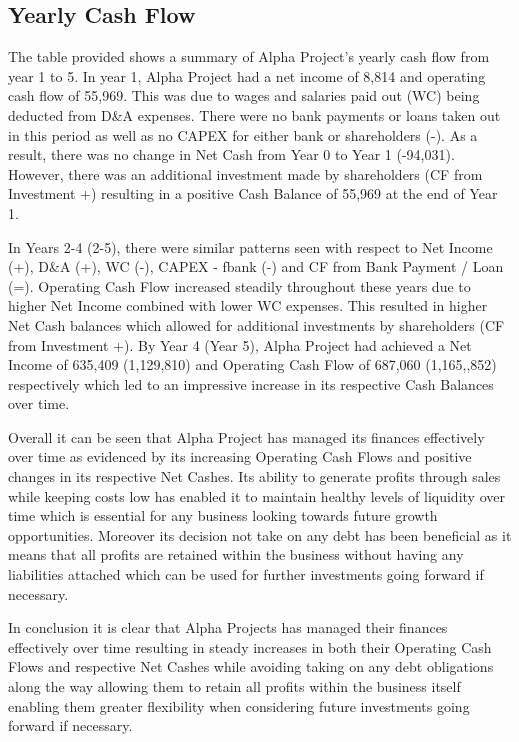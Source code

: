 

\subsection{Yearly Cash Flow}\label{sec:title}

The table provided shows a summary of Alpha Project's yearly cash flow from year 1 to 5. In year 1, Alpha Project had a net income of 8,814 and operating cash flow of 55,969. This was due to wages and salaries paid out (WC) being deducted from D&A expenses. There were no bank payments or loans taken out in this period as well as no CAPEX for either bank or shareholders (-). As a result, there was no change in Net Cash from Year 0 to Year 1 (-94,031). However, there was an additional investment made by shareholders (CF from Investment +) resulting in a positive Cash Balance of 55,969 at the end of Year 1. 

In Years 2-4 (2-5), there were similar patterns seen with respect to Net Income (+), D&A (+), WC (-), CAPEX - fbank (-) and CF from Bank Payment / Loan (=). Operating Cash Flow increased steadily throughout these years due to higher Net Income combined with lower WC expenses. This resulted in higher Net Cash balances which allowed for additional investments by shareholders (CF from Investment +). By Year 4 (Year 5), Alpha Project had achieved a Net Income of 635,409 (1,129,810) and Operating Cash Flow of 687,060 (1,165,,852) respectively which led to an impressive increase in its respective Cash Balances over time. 

Overall it can be seen that Alpha Project has managed its finances effectively over time as evidenced by its increasing Operating Cash Flows and positive changes in its respective Net Cashes. Its ability to generate profits through sales while keeping costs low has enabled it to maintain healthy levels of liquidity over time which is essential for any business looking towards future growth opportunities. Moreover its decision not take on any debt has been beneficial as it means that all profits are retained within the business without having any liabilities attached which can be used for further investments going forward if necessary. 

In conclusion it is clear that Alpha Projects has managed their finances effectively over time resulting in steady increases in both their Operating Cash Flows and respective Net Cashes while avoiding taking on any debt obligations along the way allowing them to retain all profits within the business itself enabling them greater flexibility when considering future investments going forward if necessary.